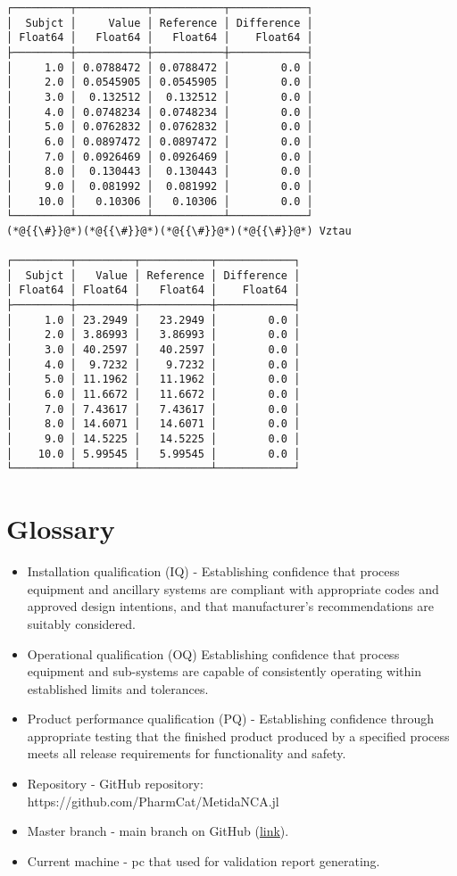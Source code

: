 \documentclass[12pt,a4paper]{article}
\begin{document}
\begin{lstlisting}
┌─────────┬───────────┬───────────┬────────────┐
│  Subjct │     Value │ Reference │ Difference │
│ Float64 │   Float64 │   Float64 │    Float64 │
├─────────┼───────────┼───────────┼────────────┤
│     1.0 │ 0.0788472 │ 0.0788472 │        0.0 │
│     2.0 │ 0.0545905 │ 0.0545905 │        0.0 │
│     3.0 │  0.132512 │  0.132512 │        0.0 │
│     4.0 │ 0.0748234 │ 0.0748234 │        0.0 │
│     5.0 │ 0.0762832 │ 0.0762832 │        0.0 │
│     6.0 │ 0.0897472 │ 0.0897472 │        0.0 │
│     7.0 │ 0.0926469 │ 0.0926469 │        0.0 │
│     8.0 │  0.130443 │  0.130443 │        0.0 │
│     9.0 │  0.081992 │  0.081992 │        0.0 │
│    10.0 │   0.10306 │   0.10306 │        0.0 │
└─────────┴───────────┴───────────┴────────────┘
(*@{{\#}}@*)(*@{{\#}}@*)(*@{{\#}}@*)(*@{{\#}}@*) Vztau

┌─────────┬─────────┬───────────┬────────────┐
│  Subjct │   Value │ Reference │ Difference │
│ Float64 │ Float64 │   Float64 │    Float64 │
├─────────┼─────────┼───────────┼────────────┤
│     1.0 │ 23.2949 │   23.2949 │        0.0 │
│     2.0 │ 3.86993 │   3.86993 │        0.0 │
│     3.0 │ 40.2597 │   40.2597 │        0.0 │
│     4.0 │  9.7232 │    9.7232 │        0.0 │
│     5.0 │ 11.1962 │   11.1962 │        0.0 │
│     6.0 │ 11.6672 │   11.6672 │        0.0 │
│     7.0 │ 7.43617 │   7.43617 │        0.0 │
│     8.0 │ 14.6071 │   14.6071 │        0.0 │
│     9.0 │ 14.5225 │   14.5225 │        0.0 │
│    10.0 │ 5.99545 │   5.99545 │        0.0 │
└─────────┴─────────┴───────────┴────────────┘
\end{lstlisting}


\section{Glossary}
\begin{itemize}
\item Installation qualification (IQ) - Establishing confidence that process equipment and ancillary systems are compliant with appropriate codes and approved design intentions, and that manufacturer's recommendations are suitably considered.


\item Operational qualification (OQ) Establishing confidence that process equipment and sub-systems are capable of consistently operating within established limits and tolerances.


\item Product performance qualification (PQ) - Establishing confidence through appropriate testing that the finished product produced by a specified process meets all release requirements for functionality and safety.


\item Repository - GitHub repository: https://github.com/PharmCat/MetidaNCA.jl


\item Master branch - main branch on GitHub (\href{https://github.com/PharmCat/MetidaNCA.jl/tree/main}{link}).


\item Current machine - pc that used for validation report generating.

\end{itemize}
\end{document}
